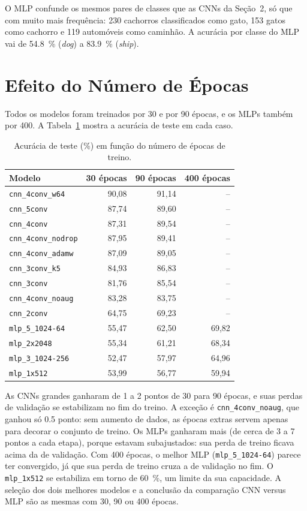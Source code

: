 \documentclass[11pt,a4paper]{article}
\newcommand{\w}[1]{\textit{#1}}
\newcommand{\code}[1]{\texttt{#1}}
\begin{document}
O MLP confunde os mesmos pares de classes que as CNNs da Seção~2, só que com muito mais frequência: 230 cachorros classificados como gato, 153 gatos como cachorro e 119 automóveis como caminhão. A acurácia por classe do MLP vai de \SI{54,8}{\percent} (\w{dog}) a \SI{83,9}{\percent} (\w{ship}).

\section{Efeito do Número de Épocas}
\label{sec:epocas}

Todos os modelos foram treinados por 30 e por 90 épocas, e os MLPs também por 400. A Tabela~\ref{tab:epocas} mostra a acurácia de teste em cada caso.

\begin{table}[H]
\centering
\caption{Acurácia de teste (\%) em função do número de épocas de treino.}
\label{tab:epocas}
\small
\begin{tabular}{lrrr}
\toprule
Modelo & 30 épocas & 90 épocas & 400 épocas \\
\midrule
\code{cnn\_4conv\_w64}    & 90,08 & 91,14 & -- \\
\code{cnn\_5conv}         & 87,74 & 89,60 & -- \\
\code{cnn\_4conv}         & 87,31 & 89,54 & -- \\
\code{cnn\_4conv\_nodrop} & 87,95 & 89,41 & -- \\
\code{cnn\_4conv\_adamw}  & 87,09 & 89,05 & -- \\
\code{cnn\_3conv\_k5}     & 84,93 & 86,83 & -- \\
\code{cnn\_3conv}         & 81,76 & 85,54 & -- \\
\code{cnn\_4conv\_noaug}  & 83,28 & 83,75 & -- \\
\code{cnn\_2conv}         & 64,75 & 69,23 & -- \\
\midrule
\code{mlp\_5\_1024-64}    & 55,47 & 62,50 & 69,82 \\
\code{mlp\_2x2048}        & 55,34 & 61,21 & 68,34 \\
\code{mlp\_3\_1024-256}   & 52,47 & 57,97 & 64,96 \\
\code{mlp\_1x512}         & 53,99 & 56,77 & 59,94 \\
\bottomrule
\end{tabular}
\end{table}

As CNNs grandes ganharam de 1 a 2 pontos de 30 para 90 épocas, e suas perdas de validação se estabilizam no fim do treino. A exceção é \code{cnn\_4conv\_noaug}, que ganhou só \num{0,5} ponto: sem aumento de dados, as épocas extras servem apenas para decorar o conjunto de treino. Os MLPs ganharam mais (de cerca de 3 a 7 pontos a cada etapa), porque estavam subajustados: sua perda de treino ficava acima da de validação. Com 400 épocas, o melhor MLP (\code{mlp\_5\_1024-64}) parece ter convergido, já que sua perda de treino cruza a de validação no fim. O \code{mlp\_1x512} se estabiliza em torno de \SI{60}{\percent}, um limite da sua capacidade. A seleção dos dois melhores modelos e a conclusão da comparação CNN versus MLP são as mesmas com 30, 90 ou 400 épocas.
\end{document}
